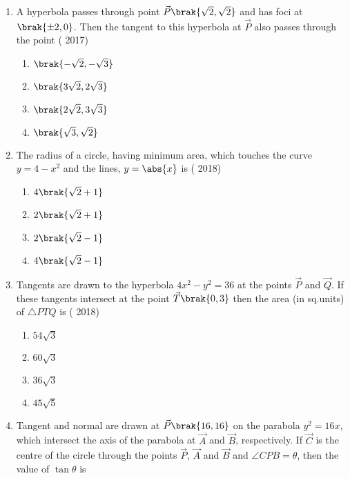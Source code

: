 \begin{enumerate}[label=\thesubsection.\arabic*.,ref=\thesubsection.\theenumi]
\item A hyperbola passes through point $\vec{P}\brak{\sqrt2,\sqrt2}$  and  has  foci  at $\brak{\pm2,0}$. Then  the  tangent  to  this  hyperbola at $\vec{P}$ also passes through the point 
      \hfill{( 2017)} 
	\begin{multicols}{4}
\begin{enumerate}
    		\item  $\brak{-\sqrt2,-\sqrt3}$
    		\item  $\brak{3\sqrt2,2\sqrt3}$
    		\item  $\brak{2\sqrt2,3\sqrt3}$
    		\item  $\brak{\sqrt3,\sqrt2}$
	\end{enumerate}
\end{multicols}
\item  The radius of a circle, having minimum area, which touches the curve $y=4-x^2$ and the lines, $y=\abs{x}$ is  
   \hfill{( 2018)}
	\begin{multicols}{2}
\begin{enumerate}
     		\item $4\brak{\sqrt2+1}$
     		\item $2\brak{\sqrt2+1}$
     		\item $2\brak{\sqrt2-1}$
     		\item $4\brak{\sqrt2-1}$
	\end{enumerate}
\end{multicols}
\item Tangents are drawn to the hyperbola $4x^2-y^2=36$ at the points $\vec{P}$ and $\vec{Q}$. If  these tangents intersect  at the point $\vec{T}\brak{0,3}$ then the area (in sq.units) of $\triangle PTQ$ is
     \hfill{( 2018)}
	\begin{multicols}{4}
\begin{enumerate}
     		\item $54\sqrt3$
     		\item $60\sqrt3$
     		\item $36\sqrt3$ 
     		\item $45\sqrt5$
	\end{enumerate}
\end{multicols}
\item Tangent and normal are drawn at $\vec{P}\brak{16,16}$ on the parabola $y^2=16x$,
which intersect the axis of the parabola at $\vec{A}$ and $\vec{B}$, respectively. If $\vec{C}$ is the centre of the circle through the points $\vec{P}$, $\vec{A}$ and $\vec{B}$ and $\angle CPB=\theta$, then the value of $\tan{\theta}$ is 

\end{enumerate}
